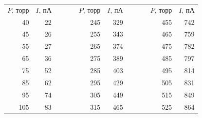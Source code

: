 \begin{enumerate}
		\newpage
		\begin{table}[h!]
			\centering
				\begin{tabular}{|r|r|rll|r|r|rll|r|r|}
					\cline{1-2} \cline{6-7} \cline{11-12}
					\multicolumn{1}{|r|}{$P$, торр} & \multicolumn{1}{r|}{$I$, пА} &  &  &  & \multicolumn{1}{r|}{$P$, торр} & \multicolumn{1}{r|}{$I$, пА} &  &  &  & \multicolumn{1}{r|}{$P$, торр} & \multicolumn{1}{r|}{$I$, пА} \\ \cline{1-2} \cline{6-7} \cline{11-12} 
					40                              & 22                           &  &  &  & 245                            & 329                          &  &  &  & 455                            & 742                          \\ \cline{1-2} \cline{6-7} \cline{11-12} 
					45                              & 26                           &  &  &  & 255                            & 343                          &  &  &  & 465                            & 759                          \\ \cline{1-2} \cline{6-7} \cline{11-12} 
					55                              & 27                           &  &  &  & 265                            & 374                          &  &  &  & 475                            & 782                          \\ \cline{1-2} \cline{6-7} \cline{11-12} 
					65                              & 36                           &  &  &  & 275                            & 389                          &  &  &  & 485                            & 797                          \\ \cline{1-2} \cline{6-7} \cline{11-12} 
					75                              & 52                           &  &  &  & 285                            & 403                          &  &  &  & 495                            & 814                          \\ \cline{1-2} \cline{6-7} \cline{11-12} 
					85                              & 62                           &  &  &  & 295                            & 429                          &  &  &  & 505                            & 831                          \\ \cline{1-2} \cline{6-7} \cline{11-12} 
					95                              & 74                           &  &  &  & 305                            & 449                          &  &  &  & 515                            & 849                          \\ \cline{1-2} \cline{6-7} \cline{11-12} 
					105                             & 83                           &  &  &  & 315                            & 465                          &  &  &  & 525                            & 864                          \\ \cline{1-2} \cline{6-7} \cline{11-12} 

\end{tabular}
\end{table}
\end{enumerate}
